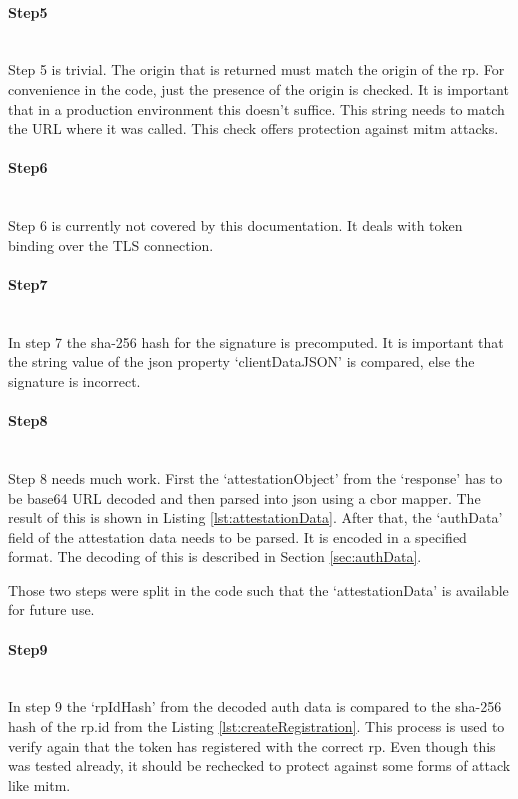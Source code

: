 \documentclass[a4paper, 11pt]{scrartcl}
\begin{document}
\paragraph{Step5}\hfill \\ 
Step 5 is trivial. The origin that is returned must match the origin of the \gls{rp}. For convenience in the code, just the presence of the origin is checked. It is important that in a production environment this doesn't suffice. This string needs to match the URL where it was called. This check offers protection against \gls{mitm} attacks.

\paragraph{Step6}\hfill \\ 
Step 6 is currently not covered by this documentation. It deals with token binding over the TLS connection.

\paragraph{Step7}\hfill \\ 
In step 7 the \gls{sha-256} hash for the signature is precomputed. It is important that the string value of the \gls{json} property `clientDataJSON' is compared, else the signature is incorrect.

\paragraph{Step8}\hfill \\ 
Step 8 needs much work. First the `attestationObject' from the `response' has to be \gls{base64} URL decoded and then parsed into \gls{json} using a \gls{cbor} mapper. The result of this is shown in Listing \ref{lst:attestationData}. After that, the `authData' field of the attestation data needs to be parsed. It is encoded in a specified format. The decoding of this is described in Section \ref{sec:authData}. \cite{webauthn:authData}

Those two steps were split in the code such that the `attestationData' is available for future use.



\paragraph{Step9}\hfill \\ 
In step 9 the `rpIdHash' from the decoded auth data is compared to the \gls{sha-256} hash of the rp.id from the Listing \ref{lst:createRegistration}. This process is used to verify again that the token has registered with the correct \gls{rp}. Even though this was tested already, it should be rechecked to protect against some forms of attack like \gls{mitm}. 
\end{document}
